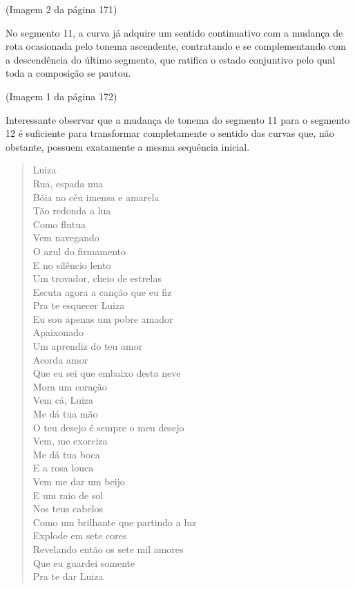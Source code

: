 (Imagem 2 da página 171)

No segmento 11, a curva já adquire um sentido continuativo com a mudança
de rota ocasionada pelo tonema ascendente, contratando e se
complementando com a descendência do último segmento, que ratifica o
estado conjuntivo pelo qual toda a composição se pautou.

(Imagem 1 da página 172)

Interessante observar que a mudança de tonema do segmento 11 para o
segmento 12 é suficiente para transformar completamente o sentido das
curvas que, não obstante, possuem exatamente a mesma sequência inicial.

\begin{verse}
Luiza\\
Rua, espada nua\\
Bóia no céu imensa e amarela\\
Tão redonda a lua\\
Como flutua\\
Vem navegando\\
O azul do firmamento\\
E no silêncio lento\\
Um trovador, cheio de estrelas\\
Escuta agora a canção que eu fiz\\
Pra te esquecer Luiza\\
Eu sou apenas um pobre amador\\
Apaixonado\\
Um aprendiz do teu amor\\
Acorda amor\\
Que eu sei que embaixo desta neve\\
Mora um coração\\
Vem cá, Luiza\\
Me dá tua mão\\
O teu desejo é sempre o meu desejo\\
Vem, me exorciza\\
Me dá tua boca\\
E a rosa louca\\
Vem me dar um beijo\\
E um raio de sol\\
Nos teus cabelos\\
Como um brilhante que partindo a luz\\
Explode em sete cores\\
Revelando então os sete mil amores\\
Que eu guardei somente\\
Pra te dar Luiza
\end{verse}

